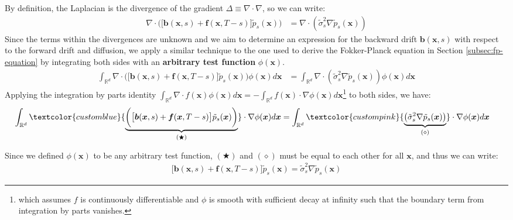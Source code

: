 \documentclass{article}
\newcommand{\bluetext}[1]{\textcolor{customblue}{#1}}
\newcommand{\pinktext}[1]{\textcolor{custompink}{#1}}
\begin{document}
By definition, the Laplacian is the divergence of the gradient $\Delta\equiv\nabla\cdot\nabla$, so we can write:
\begin{align}
    \nabla\cdot \bigg(\big[\boldsymbol{b}(\boldsymbol{x},s)+\boldsymbol{f}(\boldsymbol{x},T-s)\big] \tilde{p}_s(\boldsymbol{x})\bigg)&=\nabla\cdot \left(\tilde{\sigma}_s^2\nabla \tilde{p}_s(\boldsymbol{x})\right)
\end{align}
Since the terms within the divergences are unknown and we aim to determine an expression for the backward drift $\boldsymbol{b}(\boldsymbol{x},s)$ with respect to the forward drift and diffusion, we apply a similar technique to the one used to derive the Fokker-Planck equation in Section \ref{subsec:fp-equation} by integrating both sides with an \textbf{arbitrary test function} $\phi(\boldsymbol{x})$.
\begin{align}
    \int_{\mathbb{R}^d}\nabla\cdot \bigg(\big[\boldsymbol{b}(\boldsymbol{x},s)+\boldsymbol{f}(\boldsymbol{x},T-s)\big] \tilde{p}_s(\boldsymbol{x})\bigg)\phi(\boldsymbol{x})d\boldsymbol{x}&=\int_{\mathbb{R}^d}\nabla\cdot \left(\tilde{\sigma}_s^2\nabla \tilde{p}_s(\boldsymbol{x})\right)\phi(\boldsymbol{x})d\boldsymbol{x}
\end{align}
Applying the integration by parts identity $\int_{\mathbb{R}^d} \nabla\cdot f(\boldsymbol{x})\phi(\boldsymbol{x})d\boldsymbol{x}=-\int_{\mathbb{R}^d}f(\boldsymbol{x})\cdot\nabla\phi(\boldsymbol{x})d\boldsymbol{x}$\footnote{which assumes $f$ is continuously differentiable and $\phi$ is smooth with sufficient decay at infinity such that the boundary term from integration by parts vanishes.} to both sides, we have: 
\begin{align}
    \int_{\mathbb{R}^d} \bluetext{\underbrace{\bigg(\big[\boldsymbol{b}(\boldsymbol{x},s)+\boldsymbol{f}(\boldsymbol{x},T-s)\big] \tilde{p}_s(\boldsymbol{x})\bigg)}_{(\bigstar)}}\cdot\nabla\phi(\boldsymbol{x})d\boldsymbol{x}&=\int_{\mathbb{R}^d}\pinktext{\underbrace{\left(\tilde{\sigma}_s^2\nabla \tilde{p}_s(\boldsymbol{x})\right)}_{(\diamond)}}\cdot \nabla\phi(\boldsymbol{x})d\boldsymbol{x}
\end{align}

Since we defined $\phi(\boldsymbol{x})$ to be any arbitrary test function, $(\bigstar)$ and $(\diamond)$ must be equal to each other for all $\boldsymbol{x}$, and thus we can write: 
\begin{align}
    \big[\boldsymbol{b}(\boldsymbol{x},s)+\boldsymbol{f}(\boldsymbol{x},T-s)\big] \tilde{p}_s(\boldsymbol{x})=\tilde{\sigma}_s^2\nabla \tilde{p}_s(\boldsymbol{x})
\end{align}
\end{document}
